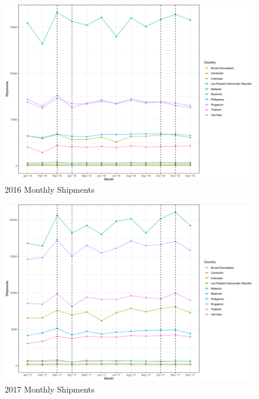 \documentclass{article}
\begin{document}
\begin{figure}[H]
\centering
\includegraphics[width=1\textwidth]{images/Line Plots/Seasonal/2016_seasonal.png}
\caption{2016 Monthly Shipments}
\end{figure}

\begin{figure}[H]
\centering
\includegraphics[width=1\textwidth]{images/Line Plots/Seasonal/2017_seasonal.png}
\caption{2017 Monthly Shipments}
\end{figure}
\end{document}
